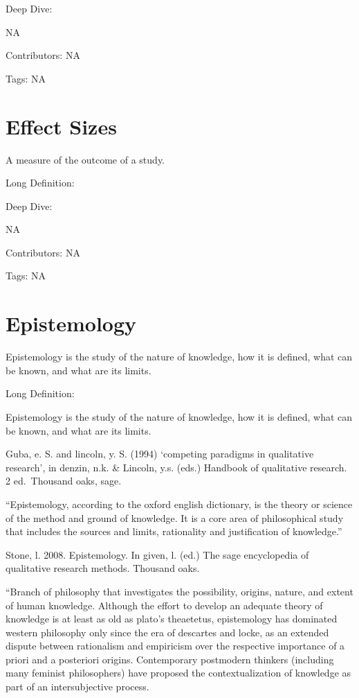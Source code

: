 \documentclass[
  letterpaper,
  DIV=11,
  numbers=noendperiod]{scrreprt}
\begin{document}
Deep Dive:

NA

Contributors: NA

Tags: NA

\section{Effect Sizes}\label{effect-sizes}

A measure of the outcome of a study.

Long Definition:

Deep Dive:

NA

Contributors: NA

Tags: NA

\section{Epistemology}\label{epistemology}

Epistemology is the study of the nature of knowledge, how it is defined,
what can be known, and what are its limits.

Long Definition:

Epistemology is the study of the nature of knowledge, how it is defined,
what can be known, and what are its limits.

Guba, e. S. and lincoln, y. S. (1994) `competing paradigms in
qualitative research', in denzin, n.k. \& Lincoln, y.s. (eds.) Handbook
of qualitative research. 2 ed.~Thousand oaks, sage.

``Epistemology, according to the oxford english dictionary, is the
theory or science of the method and ground of knowledge. It is a core
area of philosophical study that includes the sources and limits,
rationality and justification of knowledge.''

Stone, l. 2008. Epistemology. In given, l. (ed.) The sage encyclopedia
of qualitative research methods. Thousand oaks.

``Branch of philosophy that investigates the possibility, origins,
nature, and extent of human knowledge. Although the effort to develop an
adequate theory of knowledge is at least as old as plato's theaetetus,
epistemology has dominated western philosophy only since the era of
descartes and locke, as an extended dispute between rationalism and
empiricism over the respective importance of a priori and a posteriori
origins. Contemporary postmodern thinkers (including many feminist
philosophers) have proposed the contextualization of knowledge as part
of an intersubjective process.
\end{document}
